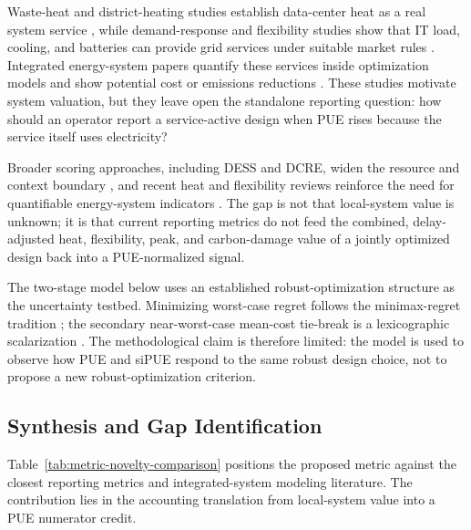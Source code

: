 \documentclass[preprint,12pt]{elsarticle}
\begin{document}
Waste-heat and district-heating studies establish data-center heat as a real system service \cite{11,10}, while demand-response and flexibility studies show that IT load, cooling, and batteries can provide grid services under suitable market rules \cite{Takci2025,Crozier2025}. Integrated energy-system papers quantify these services inside optimization models and show potential cost or emissions reductions \cite{JerezMonsalves2023,Wang2024}. These studies motivate system valuation, but they leave open the standalone reporting question: how should an operator report a service-active design when PUE rises because the service itself uses electricity?

Broader scoring approaches, including DESS and DCRE, widen the resource and context boundary \cite{Terenius2023,GreenGrid2025DCRE}, and recent heat and flexibility reviews reinforce the need for quantifiable energy-system indicators \cite{Yuan2025,Takci2025}. The gap is not that local-system value is unknown; it is that current reporting metrics do not feed the combined, delay-adjusted heat, flexibility, peak, and carbon-damage value of a jointly optimized design back into a PUE-normalized signal.

The two-stage model below uses an established robust-optimization structure as the uncertainty testbed. Minimizing worst-case regret follows the minimax-regret tradition \cite{savage1951theory,MR-1626-RPC}; the secondary near-worst-case mean-cost tie-break is a lexicographic scalarization \cite{Miettinen1999,Ehrgott2005}. The methodological claim is therefore limited: the model is used to observe how PUE and siPUE respond to the same robust design choice, not to propose a new robust-optimization criterion.

\subsection{Synthesis and Gap Identification}

Table~\ref{tab:metric-novelty-comparison} positions the proposed metric against the closest reporting metrics and integrated-system modeling literature. The contribution lies in the accounting translation from local-system value into a PUE numerator credit.
\end{document}
